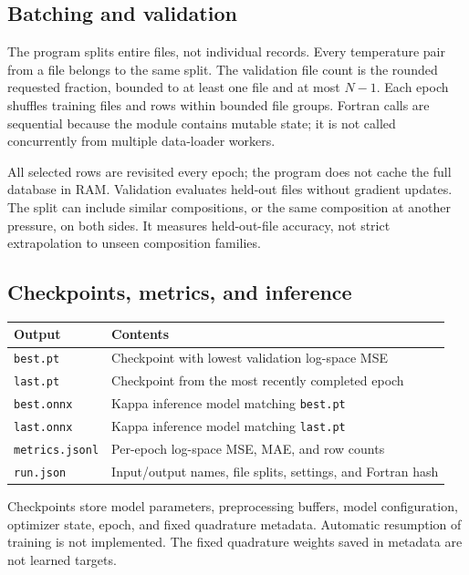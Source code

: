 \documentclass[11pt,letterpaper]{article}
\begin{document}
\subsection{Batching and validation}
The program splits entire files, not individual records. Every temperature
pair from a file belongs to the same split. The validation file count is the
rounded requested fraction, bounded to at least one file and at most $N-1$.
Each epoch shuffles training files and rows within bounded file groups.
Fortran calls are sequential because the module contains mutable state; it
is not called concurrently from multiple data-loader workers.

All selected rows are revisited every epoch; the program does not cache the
full database in RAM. Validation evaluates held-out files without gradient
updates. The split can include similar compositions, or the same composition
at another pressure, on both sides. It measures held-out-file accuracy, not
strict extrapolation to unseen composition families.

\subsection{Checkpoints, metrics, and inference}
\begin{center}
\begin{tabularx}{\linewidth}{@{}l X@{}}
\toprule
Output & Contents \\
\midrule
\texttt{best.pt} & Checkpoint with lowest validation log-space MSE \\
\texttt{last.pt} & Checkpoint from the most recently completed epoch \\
\texttt{best.onnx} & Kappa inference model matching \texttt{best.pt} \\
\texttt{last.onnx} & Kappa inference model matching \texttt{last.pt} \\
\texttt{metrics.jsonl} & Per-epoch log-space MSE, MAE, and row counts \\
\texttt{run.json} & Input/output names, file splits, settings, and Fortran hash \\
\bottomrule
\end{tabularx}
\end{center}
Checkpoints store model parameters, preprocessing buffers, model configuration,
optimizer state, epoch, and fixed quadrature metadata. Automatic resumption
of training is not implemented. The fixed quadrature weights saved in metadata
are not learned targets.
\end{document}

